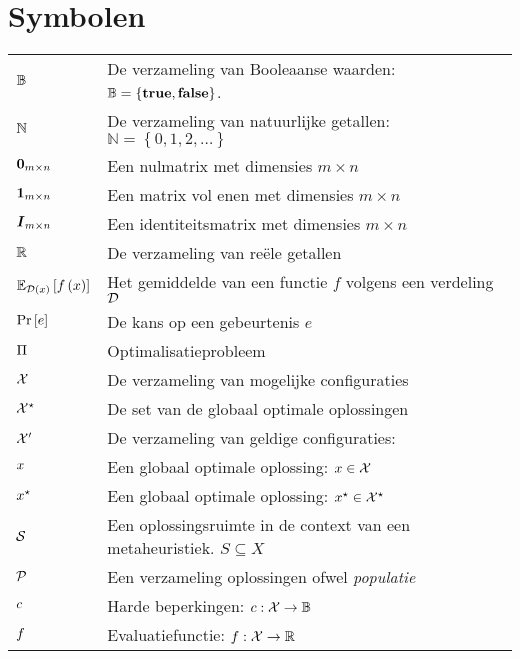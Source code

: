 \documentclass[master=elt,masteroption=ge]{kulemt}
\begin{document}
\section*{Symbolen}
\begin{flushleft}
  \renewcommand{\arraystretch}{1.1}
  \begin{tabularx}{\textwidth}{@{}p{22mm}X@{}}
    $\BoolSet$					& De verzameling van Booleaanse waarden: $\mathbb{B}=\left\{\mbox{\textbf{true}},\mbox{\textbf{false}}\right\}$. \\
    $\NatSet$					& De verzameling van natuurlijke getallen: $\mathbb{N}=\left\{0,1,2,\ldots\right\}$ \\
    $\zeromatrix[m\times n]$			& Een nulmatrix met dimensies $m\times n$\\
    $\onematrix[m\times n]$			& Een matrix vol enen met dimensies $m\times n$\\
    $\identitymatrix[m\times n]$		& Een identiteitsmatrix met dimensies $m\times n$\\
    $\RealSet$					& De verzameling van re\"ele getallen\\
    $\mean[\fun{\calD}{x}]{\fun{f}{x}}$	& Het gemiddelde van een functie $f$ volgens een verdeling $\calD$\\%
    $\Prob{e}$					& De kans op een gebeurtenis $e$\\
    $\OpProblem$				& Optimalisatieprobleem\\
    $\ConfigSet$				& De verzameling van mogelijke configuraties\\
    $\ConfigOpSet$				& De set van de globaal optimale oplossingen\\
    $\ConfigValSet$				& De verzameling van geldige configuraties: \\
    $\sol$					& Een globaal optimale oplossing: $\sol\in\ConfigSet$\\
    $\bestSol$					& Een globaal optimale oplossing: $\xstar\in\ConfigOpSet$\\
    $\SolSet$					& Een oplossingsruimte in de context van een metaheuristiek. $S\subseteq X$\\
    $\PopSet$					& Een verzameling oplossingen ofwel \emph{populatie}\\
    $\hcfun$					& Harde beperkingen: $\funsig{\hcfun}{\ConfigSet}{\BoolSet}$\\
    $\evalfun$					& Evaluatiefunctie: $\funsig{\evalfun}{\ConfigSet}{\RealSet}$\\

\end{tabularx}
\end{flushleft}
\end{document}
